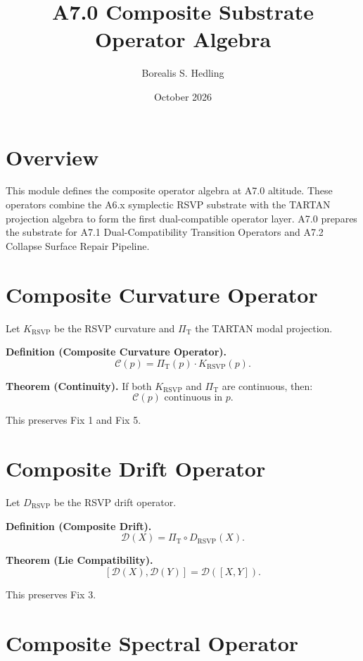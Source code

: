 \documentclass[11pt]{article}
\title{A7.0 Composite Substrate Operator Algebra}
\author{Borealis S. Hedling}
\date{October 2026}
\begin{document}
\maketitle

\section*{Overview}

This module defines the composite operator algebra at A7.0 altitude. These
operators combine the A6.x symplectic RSVP substrate with the TARTAN projection
algebra to form the first dual-compatible operator layer. A7.0 prepares the
substrate for A7.1 Dual-Compatibility Transition Operators and A7.2 Collapse
Surface Repair Pipeline.

\section{Composite Curvature Operator}

Let $K_{\mathrm{RSVP}}$ be the RSVP curvature and $\Pi_{\mathrm{T}}$ the TARTAN
modal projection.

\textbf{Definition (Composite Curvature Operator).}
\[
\mathcal{C}(p) = \Pi_{\mathrm{T}}(p) \cdot K_{\mathrm{RSVP}}(p).
\]

\textbf{Theorem (Continuity).}
If both $K_{\mathrm{RSVP}}$ and $\Pi_{\mathrm{T}}$ are continuous, then:
\[
\mathcal{C}(p) \text{ continuous in } p.
\]

This preserves Fix 1 and Fix 5.

\section{Composite Drift Operator}

Let $D_{\mathrm{RSVP}}$ be the RSVP drift operator.

\textbf{Definition (Composite Drift).}
\[
\mathcal{D}(X) = \Pi_{\mathrm{T}} \circ D_{\mathrm{RSVP}}(X).
\]

\textbf{Theorem (Lie Compatibility).}
\[
[\mathcal{D}(X), \mathcal{D}(Y)] = \mathcal{D}([X,Y]).
\]

This preserves Fix 3.

\section{Composite Spectral Operator}
\end{document}
